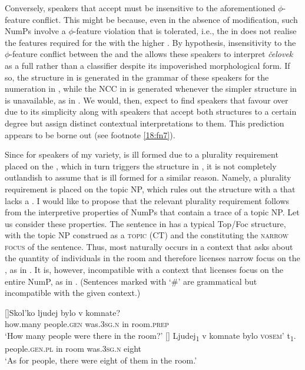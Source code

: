 \documentclass[output=paper,modfonts,newtxmath,hidelinks]{langscibook}
\begin{document}
Conversely, speakers that accept  must be insensitive to the aforementioned ${\phi}${}-feature conflict. This might be because, even in the absence of modification, such NumPs involve a ${\phi}${}-feature violation that is tolerated, i.e., the  in  does not realise the   features required for the  with the higher . By hypothesis, insensitivity to the ${\phi}${}-feature conflict between the  and the  allows these speakers to interpret \textit{čelovek} as a full  rather than a classifier despite its impoverished morphological form. If so, the structure in  is generated in the grammar of these speakers for the numeration in , while the NCC in  is generated whenever the simpler structure in  is unavailable, as in . We would, then, expect to find speakers that favour  over  due to its simplicity along with speakers that accept both structures to a certain degree but assign distinct contextual interpretations to them. This prediction appears to be borne out (see footnote \ref{18:fn7}).

\largerpage[2]
Since for speakers of my variety,  is ill formed due to a plurality requirement placed on the , which in turn triggers the structure in , it is not completely outlandish to assume that  is ill formed for a similar reason. Namely, a plurality requirement is placed on the topic NP, which rules out the structure with a  that lacks a  . I would like to propose that the relevant plurality requirement follows from the interpretive properties of NumPs that contain a trace of a topic NP. Let us consider these properties. The sentence in  has a typical Top/Foc structure, with the topic NP construed as a \textsc{ topic} (CT) and the  constituting the \textsc{narrow focus} of the sentence. Thus,  most naturally occurs in a context that asks about the quantity of individuals  in the room and therefore licenses narrow focus on the , as in . It is, however, incompatible with a context that licenses focus on the entire NumP, as in . (Sentences marked with ‘\#’ are grammatical but incompatible with the given context.)

\begin{exe} 
\ex \label{18:ex20}
\begin{xlist}
[]{\gll Skol’ko ljudej bylo v komnate?\\
how.many people.\textsc{gen} was.\textsc{3sg.n} in room.\textsc{prep}\\
	\glt `How many people were there in the room?'
    }
[]{ 
	\gll Ljudej\textsubscript{1}    v   komnate  bylo     \textsc{vosem’}   t\textsubscript{1}.\\
		 people.\textsc{gen.pl} in   room    was.\textsc{3sg.n}  eight  \\
	\glt `As for people, there were eight of them in the room.'
    }
\end{xlist}
\end{exe}
\end{document}
